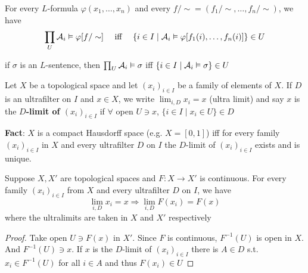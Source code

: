 \documentclass[11pt]{article}
\begin{document}
\begin{theorem}
\label{thmB.7}
For every \(L\)-formula \(\varphi(x_1,\dots,x_n)\) and every \(f/\sim=(f_1/\sim,\dots,f_n/\sim)\), we
have
\begin{equation*}
  \prod_U\mathcal{A}_i\vDash\varphi[f/\sim] \quad\text{ iff }\quad
  \{i\in I\mid\mathcal{A}_i\vDash\varphi[f_1(i),\dots,f_n(i)]\}\in U
\end{equation*}
\end{theorem}

\begin{corollary}[]
\label{corB.8}
if \(\sigma\) is an \(L\)-sentence, then \(\prod_U\mathcal{A}_i\vDash\sigma\) iff
\(\{i\in I\mid\mathcal{A}_i\vDash\sigma\}\in U\)
\end{corollary}

Let \(X\) be a topological space and let \((x_i)_{i\in I}\) be a family of elements of \(X\).
If \(D\) is an ultrafilter on \(I\) and \(x\in X\), we write \(\lim_{i,D}x_i=x\) (ultra limit) and
say \(x\) is the \textbf{\(D\)-limit of \((x_i)_{i\in I}\)} if \(\forall\)
open \(U\ni x\), \(\{i\in I\mid x_i\in U\}\in D\)

\textbf{Fact}: \(X\) is a compact Hausdorff space (e.g. \(X=[0,1]\)) iff for every family \((x_i)_{i\in I}\) in \(X\) and
 every ultrafilter \(D\) on \(I\) the \(D\)-limit of \((x_i)_{i\in I}\) exists and is unique.

\begin{lemma}[]
\label{lemmaB.9}
Suppose \(X,X'\) are topological spaces and \(F:X\to X'\) is continuous. For every
family \((x_i)_{i\in I}\) from \(X\) and every ultrafilter \(D\) on \(I\), we have
\begin{equation*}
 \lim_{i, D}x_i=x\Rightarrow\lim_{i,D}F(x_i)=F(x)
\end{equation*}
where the ultralimits are taken in \(X\) and \(X'\) respectively
\end{lemma}

\begin{proof}
Take open \(U\ni F(x)\) in \(X'\). Since \(F\) is continuous, \(F^{-1}(U)\) is open in \(X\).
And \(F^{-1}(U)\ni x\). If \(x\) is the \(D\)-limit of \((x_i)_{i\in I}\) there is \(A\in D\)
s.t. \(x_i\in F^{-1}(U)\) for all \(i\in A\) and thus \(F(x_i)\in U\)
\end{proof}
\end{document}
